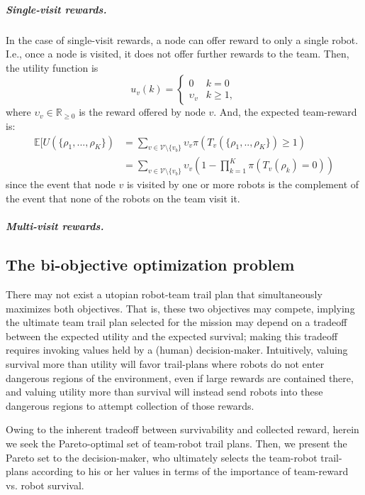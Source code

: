 \documentclass[11pt, oneside]{article}
\begin{document}
\subparagraph{Single-visit rewards.}
In the case of single-visit rewards, a node can offer reward to only a single robot. I.e., once a node is visited, it does not offer further rewards to the team. Then, the utility function is
\begin{equation}
	u_v(k) = \begin{cases}
		0 & k = 0 \\
		\upsilon_v & k \geq 1,
	\end{cases}
\end{equation} where $\upsilon_v \in \mathbb{R}_{\geq 0}$ is the reward offered by node $v$. And, the expected team-reward is:
\begin{align}
	\mathbb{E}[U(\{\rho_1, ..., \rho_K\}) & = \sum_{v \in \mathcal{V} \setminus \{v_b\}} \upsilon_v \pi(T_v(\{\rho_1, .., \rho_K\}) \geq 1) \\
		      & = \sum_{v \in \mathcal{V} \setminus \{v_b\}} \upsilon_v \left(1 - \prod_{k=1}^K  \pi(T_v(\rho_k) =0) \right)
\end{align} since the event that node $v$ is visited by one or more robots is the complement of the event that none of the robots on the team visit it.

\subparagraph{Multi-visit rewards.}

\subsection{The bi-objective optimization problem}


There may not exist a utopian robot-team trail plan that simultaneously maximizes both objectives. 
That is, these two objectives may compete, implying the ultimate team trail plan selected for the mission may depend on a tradeoff between the expected utility and the expected survival; making this tradeoff requires invoking values held by a (human) decision-maker. Intuitively, valuing survival more than utility will favor trail-plans where robots do not enter dangerous regions of the environment, even if large rewards are contained there, and valuing utility more than survival will instead send robots into these dangerous regions to attempt collection of those rewards. 

Owing to the inherent tradeoff between survivability and collected reward, herein we seek the Pareto-optimal set of team-robot trail plans. Then, we present the Pareto set to the decision-maker, who ultimately selects the team-robot trail-plans according to his or her values in terms of the importance of team-reward vs. robot survival. 
\end{document}
